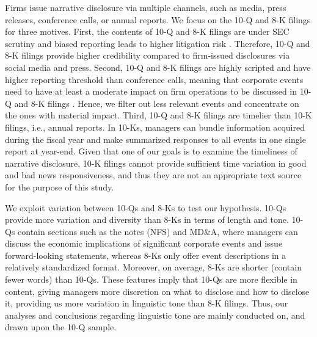 \documentclass[letterpaper,12pt]{article}
\begin{document}
\begin{spacing}{1.5}
Firms issue narrative disclosure via multiple channels, such as media, press releases, conference calls, or annual reports. We focus on the 10-Q and 8-K filings for three motives. First, the contents of 10-Q and 8-K filings are under SEC scrutiny and biased reporting leads to higher litigation risk \cite{rogersDisclosureToneShareholder2011}. Therefore, 10-Q and 8-K filings provide higher credibility compared to firm-issued disclosures via social media and press. Second, 10-Q and 8-K filings are highly scripted and have higher reporting threshold than conference calls, meaning that corporate events need to have at least a moderate impact on firm operations to be discussed in 10-Q and 8-K filings \cite{hassanFirmLevelPoliticalRisk2019}. Hence, we filter out less relevant events and concentrate on the ones with material impact. Third, 10-Q and 8-K filings are timelier than 10-K filings, i.e., annual reports. In 10-Ks, managers can bundle information acquired during the fiscal year and make summarized responses to all events in one single report at year-end. Given that one of our goals is to examine the timeliness of narrative disclosure, 10-K filings cannot provide sufficient time variation in good and bad news responsiveness, and thus they are not an appropriate text source for the purpose of this study.

We exploit variation between 10-Qs and 8-Ks to test our hypothesis. 10-Qs provide more variation and diversity than 8-Ks in terms of length and tone. 10-Qs contain sections such as the notes (NFS) and MD\&A, where managers can discuss the economic implications of significant corporate events and issue forward-looking statements, whereas 8-Ks only offer event descriptions in a relatively standardized format. Moreover,  on average, 8-Ks are shorter (contain fewer words) than 10-Qs. These features imply that 10-Qs are more flexible in content, giving managers more discretion on what to disclose and how to disclose it, providing us more variation in linguistic tone than 8-K filings. Thus, our analyses and conclusions regarding linguistic tone are mainly conducted on, and drawn upon the 10-Q sample. 


\end{spacing}
\end{document}
